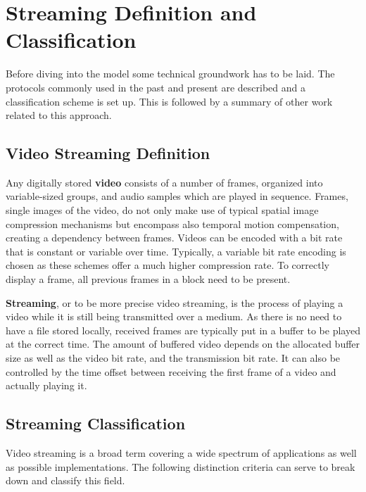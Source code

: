 \section{Streaming Definition and Classification}
\label{c3:sec:background}

Before diving into the model some technical groundwork has to be laid. The protocols commonly used in the past and present are described and a classification scheme is set up. This is followed by a summary of other work related to this approach.


\subsection{Video Streaming Definition} 

Any digitally stored \textbf{video} consists of a number of frames, organized into variable-sized groups, and audio samples which are played in sequence. Frames, single images of the video, do not only make use of typical spatial image compression mechanisms but encompass also temporal motion compensation, creating a dependency between frames. Videos can be encoded with a bit rate that is constant or variable over time. Typically, a variable bit rate encoding is chosen as these schemes offer a much higher compression rate. To correctly display a frame, all previous frames in a block need to be present. 

\textbf{Streaming}, or to be more precise video streaming, is the process of playing a video while it is still being transmitted over a medium. As there is no need to have a file stored locally, received frames are typically put in a buffer to be played at the correct time. The amount of buffered video depends on the allocated buffer size as well as the video bit rate, and the transmission bit rate. It can also be controlled by the time offset between receiving the first frame of a video and actually playing it.


\subsection{Streaming Classification}

Video streaming is a broad term covering a wide spectrum of applications as well as possible implementations. The following distinction criteria can serve to break down and classify this field.

